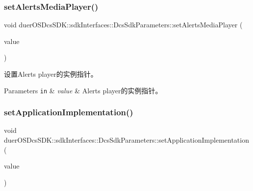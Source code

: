 \subsubsection{\texorpdfstring{set\+Alerts\+Media\+Player()}{setAlertsMediaPlayer()}}
{\footnotesize\ttfamily void duer\+O\+S\+Dcs\+S\+D\+K\+::sdk\+Interfaces\+::\+Dcs\+Sdk\+Parameters\+::set\+Alerts\+Media\+Player (\begin{DoxyParamCaption}\item[{std\+::shared\+\_\+ptr$<$ \hyperlink{classduerOSDcsSDK_1_1sdkInterfaces_1_1MediaPlayerInterface}{Media\+Player\+Interface} $>$}]{value }\end{DoxyParamCaption})\hspace{0.3cm}{\ttfamily [inline]}}



设置\+Alerts player的实例指针。 


\begin{DoxyParams}[1]{Parameters}
\mbox{\tt in}  & {\em value} & Alerts player的实例指针。 \\
\hline
\end{DoxyParams}
\mbox{\label{structduerOSDcsSDK_1_1sdkInterfaces_1_1DcsSdkParameters_a4560432cd5e52eb3aed9f40dba480ac3}} 
\subsubsection{\texorpdfstring{set\+Application\+Implementation()}{setApplicationImplementation()}}
{\footnotesize\ttfamily void duer\+O\+S\+Dcs\+S\+D\+K\+::sdk\+Interfaces\+::\+Dcs\+Sdk\+Parameters\+::set\+Application\+Implementation (\begin{DoxyParamCaption}\item[{std\+::shared\+\_\+ptr$<$ \hyperlink{classduerOSDcsSDK_1_1sdkInterfaces_1_1ApplicationImplementation}{sdk\+Interfaces\+::\+Application\+Implementation} $>$}]{value }\end{DoxyParamCaption})\hspace{0.3cm}{\ttfamily [inline]}}



